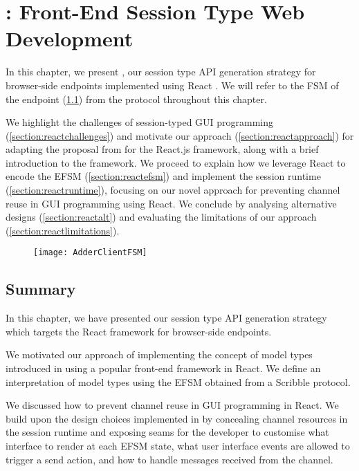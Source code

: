 \chapter{\reactcodegen: Front-End Session Type Web Development}
\label{chap:react}

In this chapter, we present \reactcodegen,
our session type API generation strategy for browser-side endpoints
implemented using React \cite{React}.
We will refer to the FSM of the 
endpoint (\cref{fig:adderclientfsm})
from the  protocol 
throughout this chapter.

We highlight the challenges of session-typed GUI programming
(\cref{section:reactchallenges}) and motivate 
our approach (\cref{section:reactapproach})
for adapting the proposal from
\cite{MVU2020} for the React.js framework, along with a brief
introduction to the framework.
We proceed to explain how we leverage React
to encode the EFSM (\cref{section:reactefsm})
and implement the session runtime (\cref{section:reactruntime}),
focusing on our novel approach for preventing
channel reuse in GUI programming using React.
We conclude by analysing alternative designs
(\cref{section:reactalt})
and evaluating the limitations of our approach
(\cref{section:reactlimitations}).

\begin{figure}[!b]
\centering
\texttt{[image: AdderClientFSM]}
\label{fig:adderclientfsm}
\end{figure}








\section{Summary}
In this chapter, we have presented
our session type API generation strategy
which targets the React framework for browser-side endpoints.

We motivated our approach of
implementing the concept of model types introduced in \cite{MVU2020}
using a popular front-end framework in React.
We define an interpretation of model types
using the EFSM obtained from a Scribble protocol.

We discussed how to prevent channel reuse in
GUI programming in React. We build upon the design choices
implemented in \nodecodegen by concealing channel resources
in the session runtime and exposing seams for the developer
to customise what interface to render at each EFSM state,
what user interface events are allowed to trigger a send action,
and how to handle messages received from the channel.

